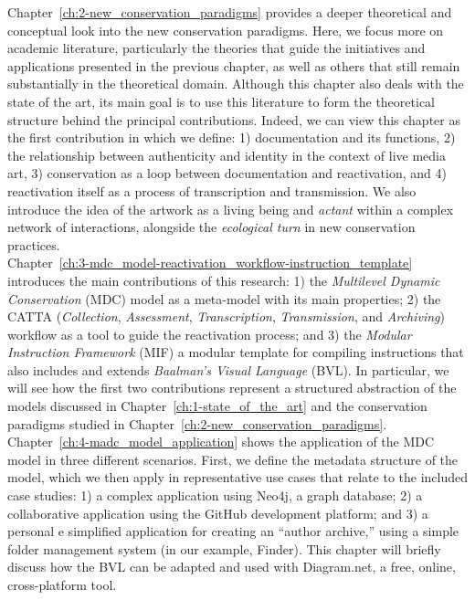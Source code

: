 Chapter~\ref{ch:2-new_conservation_paradigms} provides a deeper theoretical and conceptual look into the new conservation paradigms. Here, we focus more on academic literature, particularly the theories that guide the initiatives and applications presented in the previous chapter, as well as others that still remain substantially in the theoretical domain. Although this chapter also deals with the state of the art, its main goal is to use this literature to form the theoretical structure behind the principal contributions. Indeed, we can view this chapter as the first contribution in which we define: 1) documentation and its functions, 2) the relationship between authenticity and identity in the context of live media art, 3) conservation as a loop between documentation and reactivation, and 4) reactivation itself as a process of transcription and transmission. We also introduce the idea of the artwork as a living being and \textit{actant} within a complex network of interactions, alongside the \textit{ecological turn} in new conservation practices.\\
Chapter~\ref{ch:3-mdc_model-reactivation_workflow-instruction_template} introduces the main contributions of this research: 1) the \textit{Multilevel Dynamic Conservation} (MDC) model as a meta-model with its main properties; 2) the CATTA (\textit{Collection}, \textit{Assessment}, \textit{Transcription}, \textit{Transmission}, and \textit{Archiving}) workflow as a tool to guide the reactivation process; and 3) the \textit{Modular Instruction Framework} (MIF) a modular template for compiling instructions that also includes and extends \textit{Baalman’s Visual Language} (BVL). In particular, we will see how the first two contributions represent a structured abstraction of the models discussed in Chapter~\ref{ch:1-state_of_the_art} and the conservation paradigms studied in Chapter~\ref{ch:2-new_conservation_paradigms}.\\
Chapter~\ref{ch:4-madc_model_application} shows the application of the MDC model in three different scenarios. First, we define the metadata structure of the model, which we then apply in representative use cases that relate to the included case studies: 1) a complex application using Neo4j, a graph database; 2) a collaborative application using the GitHub development platform; and 3) a personal e simplified application for creating an ``author archive,'' using a simple folder management system (in our example, Finder). This chapter will briefly discuss how the BVL can be adapted and used with Diagram.net, a free, online, cross-platform tool.\\
